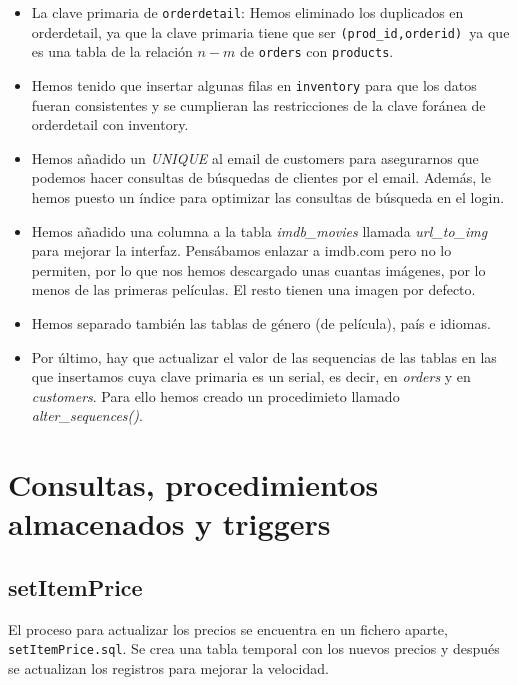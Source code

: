 \documentclass[nochap]{apuntes}
\begin{document}
\begin{itemize}

\item La clave primaria de \texttt{orderdetail}: Hemos eliminado los duplicados en orderdetail, ya que la clave primaria tiene que ser \texttt{(prod\_id,orderid) }ya que es una tabla de la relación $n-m$ de \texttt{orders} con \texttt{products}.

\item Hemos tenido que insertar algunas filas en \texttt{inventory} para que los datos fueran consistentes y se cumplieran las restricciones de la clave foránea de orderdetail con inventory.

\item Hemos añadido un \textit{UNIQUE} al email de customers para asegurarnos que podemos hacer consultas de búsquedas de clientes por el email. Además, le hemos puesto un índice para optimizar las consultas de búsqueda en el login.

\item Hemos añadido una columna a la tabla \textit{imdb\_movies} llamada \textit{url\_to\_img} para mejorar la interfaz. Pensábamos enlazar a imdb.com pero no lo permiten, por lo que nos hemos descargado unas cuantas imágenes, por lo menos de las primeras películas. El resto tienen una imagen por defecto.

\item Hemos separado también las tablas de género (de película), país e idiomas.

\item Por último, hay que actualizar el valor de las sequencias de las tablas en las que insertamos cuya clave primaria es un serial, es decir, en \textit{orders} y en \textit{customers}. Para ello hemos creado un procedimieto llamado \textit{alter\_sequences()}.
\end{itemize}



\section{Consultas, procedimientos almacenados y triggers}
\subsection{setItemPrice}
El proceso para actualizar los precios se encuentra en un fichero aparte, \texttt{setItemPrice.sql}. Se crea una tabla temporal con los nuevos precios y después se actualizan los registros para mejorar la velocidad.
\end{document}
